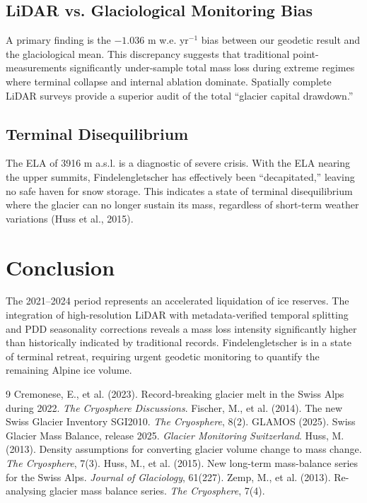\documentclass[12pt, a4paper]{article}
\begin{document}
	\subsection{LiDAR vs. Glaciological Monitoring Bias}
	A primary finding is the $-1.036$ m w.e. yr$^{-1}$ bias between our geodetic result and the glaciological mean. This discrepancy suggests that traditional point-measurements significantly under-sample total mass loss during extreme regimes where terminal collapse and internal ablation dominate. Spatially complete LiDAR surveys provide a superior audit of the total ``glacier capital drawdown.''
	
	\subsection{Terminal Disequilibrium}
	The ELA of 3916 m a.s.l. is a diagnostic of severe crisis. With the ELA nearing the upper summits, Findelengletscher has effectively been ``decapitated,'' leaving no safe haven for snow storage. This indicates a state of terminal disequilibrium where the glacier can no longer sustain its mass, regardless of short-term weather variations (Huss et al., 2015).
	
	\section{Conclusion}
	The 2021--2024 period represents an accelerated liquidation of ice reserves. The integration of high-resolution LiDAR with metadata-verified temporal splitting and PDD seasonality corrections reveals a mass loss intensity significantly higher than historically indicated by traditional records. Findelengletscher is in a state of terminal retreat, requiring urgent geodetic monitoring to quantify the remaining Alpine ice volume.
	
	\begin{thebibliography}{9}
		 Cremonese, E., et al. (2023). Record-breaking glacier melt in the Swiss Alps during 2022. \textit{The Cryosphere Discussions}.
		 Fischer, M., et al. (2014). The new Swiss Glacier Inventory SGI2010. \textit{The Cryosphere}, 8(2).
		 GLAMOS (2025). Swiss Glacier Mass Balance, release 2025. \textit{Glacier Monitoring Switzerland}.
		 Huss, M. (2013). Density assumptions for converting glacier volume change to mass change. \textit{The Cryosphere}, 7(3).
		 Huss, M., et al. (2015). New long-term mass-balance series for the Swiss Alps. \textit{Journal of Glaciology}, 61(227).
		 Zemp, M., et al. (2013). Re-analysing glacier mass balance series. \textit{The Cryosphere}, 7(4).
	\end{thebibliography}
	
\end{document}
